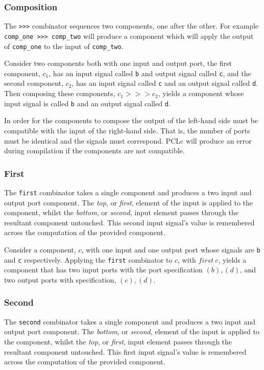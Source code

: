 \subsubsection{Composition}
The \texttt{>>>} combinator sequences two components, one after the other. For example \texttt{comp\_one >>> comp\_two} will produce a component which will apply the output of \texttt{comp\_one} to the input of \texttt{comp\_two}.

Consider two components both with one input and output port, the first component, $c_1$, has an input signal called \texttt{b} and output signal called \texttt{c}, and the second component, $c_2$, has an input signal called \texttt{c} and an output signal called \texttt{d}. Then composing these components, $c_1 >>> c_2$, yields a component whose input signal is called \texttt{b} and an output signal called \texttt{d}.

In order for the components to compose the output of the left-hand side must be compatible with the input of the right-hand side. That is, the number of ports must be identical and the signals must correspond. PCLc will produce an error during compilation if the components are not compatible.

\subsubsection{First}
The \texttt{first} combinator takes a single component and produces a two input and output port component. The \emph{top}, or \emph{first}, element of the input is applied to the component, whilst the \emph{bottom}, or \emph{second}, input element passes through the resultant component untouched. This second input signal's value is remembered across the computation of the provided component.

Consider a component, $c$, with one input and one output port whose signals are \texttt{b} and \texttt{c} respectively. Applying the \texttt{first} combinator to $c$, with $first\ c$, yields a component that has two input ports with the port specification $(b), (d)$, and two output ports with specification, $(c), (d)$.

\subsubsection{Second}
The \texttt{second} combinator takes a single component and produces a two input and output port component. The \emph{bottom}, or \emph{second}, element of the input is applied to the component, whilst the \emph{top}, or \emph{first}, input element passes through the resultant component untouched. This first input signal's value is remembered across the computation of the provided component.

